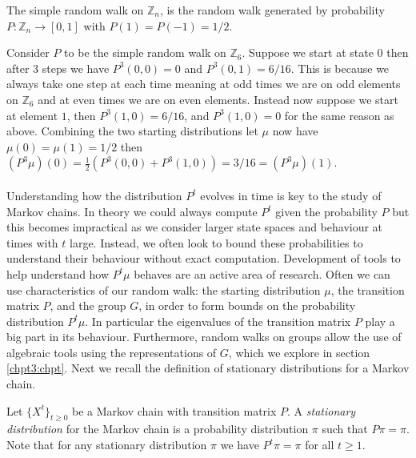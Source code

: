 \documentclass[11pt]{report}
\begin{document}
\begin{example}
	The simple random walk on $\mathbb{Z}_{n}$, is the random walk generated by probability $P:\mathbb{Z}_{n} \to [0,1]$ with $P(1) = P(-1) =1/2$.
	
	Consider $P$ to be the simple random walk on $\mathbb{Z}_{6}$.
	Suppose we start at state $0$ then after $3$ steps we have $P^{3}(0,0) = 
	0$ and $P^{3}(0,1) = 6/16$. This is because we always take one step at 
	each time meaning at odd times we are on odd elements on $\mathbb{Z}_{6}$ 
	and at even times we are on even elements.
	Instead now suppose we start at element $1$, then $P^{3}(1,0) = 6/16$, 
	and $P^{3}(1,0) = 0$ for the same reason as above.
	Combining the two starting distributions let $\mu$ now have $\mu(0) = 
	\mu(1) 
	=1/2$ then $(P^{3}\mu)(0)  = \frac{1}{2}(P^{3}(0,0) + 
	P^{3}(1,0)) = 3/16 =  (P^{3} \mu)(1).$
\end{example} 

\paragraph{}
Understanding how the distribution $P^{t}$ evolves in time is key to the study of Markov chains. In theory we could 
always compute $P^{t}$ given the probability $P$ but this becomes 
impractical as we consider larger state spaces and  behaviour at times with $t$ large. Instead, we often look to bound these probabilities to understand their behaviour without exact computation. 
Development of tools to help understand how $P^{t}\mu$ behaves are an active area of research. Often we can use 
characteristics of our random walk: the starting distribution $\mu$, the 
transition matrix $P$, and the group $G$, in order to form bounds on the 
probability distribution $P^{t} \mu$. In particular the eigenvalues 
of the transition matrix $P$ play a big part in its behaviour. Furthermore, random 
walks on groups allow the use of algebraic tools 
using the representations of $G$, which we explore in section \ref{chpt3:chpt}. Next we recall the definition of stationary 
distributions for a Markov chain.

\begin{defn}
	Let $\{X^{t}\}_{t\geq0}$ be a Markov chain with 
	transition matrix $P$. A \emph{stationary distribution} for the Markov chain is a probability distribution $\pi$ such that $ P\pi  = \pi$. Note that for any stationary distribution $\pi$ we have $P^{t}\pi  = \pi$ for all $t \geq 1$.
\end{defn}
\end{document}
